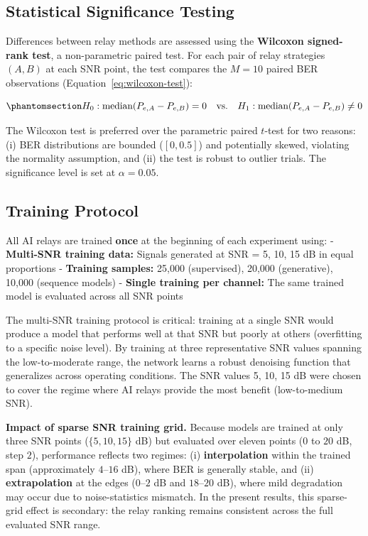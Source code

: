 \subsection{Statistical Significance Testing}\label{sec:statistical-significance-testing}

Differences between relay methods are assessed using the \textbf{Wilcoxon signed-rank test}, a non-parametric paired test. For each pair of relay strategies \((A, B)\) at each SNR point, the test compares the \(M = 10\) paired BER observations (Equation~\ref{eq:wilcoxon-test}):

\begin{equation}\protect\phantomsection\label{eq:wilcoxon-test}{H_0: \text{median}(P_{e,A} - P_{e,B}) = 0 \quad \text{vs.} \quad H_1: \text{median}(P_{e,A} - P_{e,B}) \neq 0
}\end{equation}

The Wilcoxon test is preferred over the parametric paired \(t\)-test for two reasons: (i) BER distributions are bounded (\([0, 0.5]\)) and potentially skewed, violating the normality assumption, and (ii) the test is robust to outlier trials. The significance level is set at \(\alpha = 0.05\).

\subsection{Training Protocol}\label{sec:training-protocol}

All AI relays are trained \textbf{once} at the beginning of each experiment using: - \textbf{Multi-SNR training data:} Signals generated at SNR = 5, 10, 15 dB in equal proportions - \textbf{Training samples:} 25,000 (supervised), 20,000 (generative), 10,000 (sequence models) - \textbf{Single training per channel:} The same trained model is evaluated across all SNR points

The multi-SNR training protocol is critical: training at a single SNR would produce a model that performs well at that SNR but poorly at others (overfitting to a specific noise level). By training at three representative SNR values spanning the low-to-moderate range, the network learns a robust denoising function that generalizes across operating conditions. The SNR values 5, 10, 15 dB were chosen to cover the regime where AI relays provide the most benefit (low-to-medium SNR).

\textbf{Impact of sparse SNR training grid.} Because models are trained at only three SNR points (\(\{5,10,15\}\) dB) but evaluated over eleven points (\(0\) to \(20\) dB, step \(2\)), performance reflects two regimes: (i) \textbf{interpolation} within the trained span (approximately \(4\)--\(16\) dB), where BER is generally stable, and (ii) \textbf{extrapolation} at the edges (\(0\)--\(2\) dB and \(18\)--\(20\) dB), where mild degradation may occur due to noise-statistics mismatch. In the present results, this sparse-grid effect is secondary: the relay ranking remains consistent across the full evaluated SNR range.

